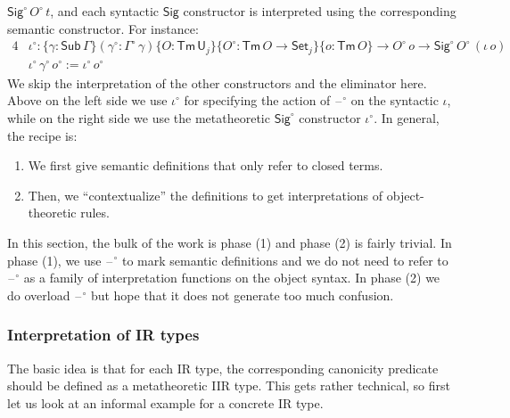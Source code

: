 \documentclass[acmsmall,screen,review,anonymous]{acmart}
\newcommand{\msf}[1]{{\mathsf{#1}}}
\newcommand{\U}{\msf{U}}
\newcommand{\Set}{\msf{Set}}
\newcommand{\Sig}{\msf{Sig}}
\newcommand{\blank}{{\mathord{\hspace{1pt}\text{--}\hspace{1pt}}}}
\newcommand{\Sub}{\msf{Sub}}
\newcommand{\Tm}{\msf{Tm}}
\newcommand{\w}{\circ}
\begin{document}
$\Sig^\w\,O^\w\,t$, and each syntactic $\Sig$ constructor is interpreted using the corresponding
semantic constructor. For instance:
\begin{alignat*}{4}
  &\iota^\w : \{\gamma : \Sub\,\Gamma\}(\gamma^\w : \Gamma^\w\,\gamma)\{O : \Tm\,\U_j\}\{O^\w : \Tm\,O \to \Set_j\}\{o : \Tm\,O\} \to O^\w\,o \to \Sig^\w\,O^\w\,(\iota\,o)\\
  &\iota^\w\,\gamma^\w\,o^\w := \iota^\w\,o^\w
\end{alignat*}
We skip the interpretation of the other constructors and the eliminator here. Above on the left side
we use $\iota^\w$ for specifying the action of $\blank^\w$ on the syntactic $\iota$, while on the
right side we use the metatheoretic $\Sig^\w$ constructor $\iota^\w$. In general, the recipe is:
\begin{enumerate}
\item We first give semantic definitions that only refer to closed terms.
\item Then, we ``contextualize'' the definitions to get interpretations of object-theoretic rules.
\end{enumerate}
In this section, the bulk of the work is phase (1) and phase (2) is fairly trivial. In phase (1), we
use $\blank^\w$ to mark semantic definitions and we do not need to refer to $\blank^\w$ as a family
of interpretation functions on the object syntax. In phase (2) we do overload $\blank^\w$ but
hope that it does not generate too much confusion.

\subsubsection{Interpretation of IR types}

The basic idea is that for each IR type, the corresponding canonicity predicate should be defined as
a metatheoretic IIR type. This gets rather technical, so first let us look at an informal example
for a concrete IR type.
\end{document}
